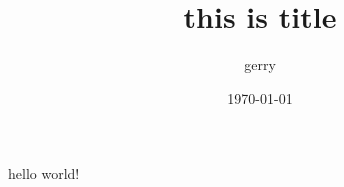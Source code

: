 \documentclass{article}
\begin{document}
\title{this is title}
\author{gerry}
\date{\today}
\maketitle
hello world!
\end{document}
